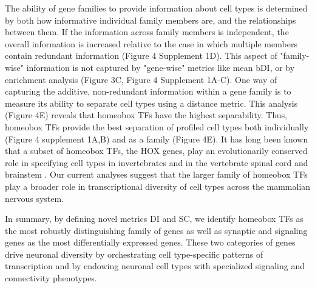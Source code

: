 The ability of gene families to provide information about cell types is determined by both how informative individual family members are, and the relationships between them. If the information across family members is independent, the overall information is increased relative to the case in which multiple members contain redundant information (Figure 4 Supplement 1D). This aspect of "family-wise" information is not captured by "gene-wise" metrics like mean bDI, or by enrichment analysis (Figure 3C, Figure 4 Supplement 1A-C). One way of capturing the additive, non-redundant information within a gene family is to measure its ability to separate cell types using a distance metric. This analysis (Figure 4E) reveals that homeobox TFs have the highest separability. Thus, homeobox TFs provide the best separation of profiled cell types both individually (Figure 4 supplement 1A,B) and as a family (Figure 4E). It has long been known that a subset of homeobox TFs, the HOX genes, play an evolutionarily conserved role in specifying cell types in invertebrates \citep{Kratsios_2017,Zheng_2015} and in the vertebrate spinal cord and brainstem \citep{Dasen_2009,Philippidou_2013}. Our current analyses suggest that the larger family of homeobox TFs play a broader role in transcriptional diversity of cell types across the mammalian nervous system.

In summary, by defining novel metrics DI and SC, we identify homeobox TFs as the most robustly distinguishing family of genes as well as synaptic and signaling genes as the most differentially expressed genes. These two categories of genes drive neuronal diversity by orchestrating cell type-specific patterns of transcription and by endowing neuronal cell types with specialized signaling and connectivity phenotypes.



